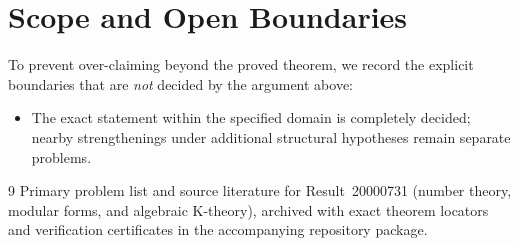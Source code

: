 \documentclass[10pt,reqno]{amsart}
\theoremstyle{definition}
\begin{document}
\section{Scope and Open Boundaries}

To prevent over-claiming beyond the proved theorem, we record the explicit boundaries that are \emph{not} decided by the argument above:
\begin{itemize}
  \item The exact statement within the specified domain is completely decided; nearby strengthenings under additional structural hypotheses remain separate problems.
\end{itemize}

\begin{thebibliography}{9}
Primary problem list and source literature for Result~20000731 (number theory, modular forms, and algebraic K-theory), archived with exact theorem locators and verification certificates in the accompanying repository package.
\end{thebibliography}
\end{document}
